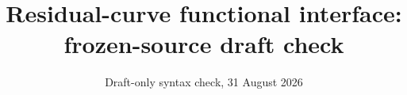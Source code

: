 \documentclass[11pt]{article}
\begin{document}
\title{Residual-curve functional interface: frozen-source draft check}
\author{}
\date{Draft-only syntax check, 31 August 2026}
\maketitle




\end{document}
